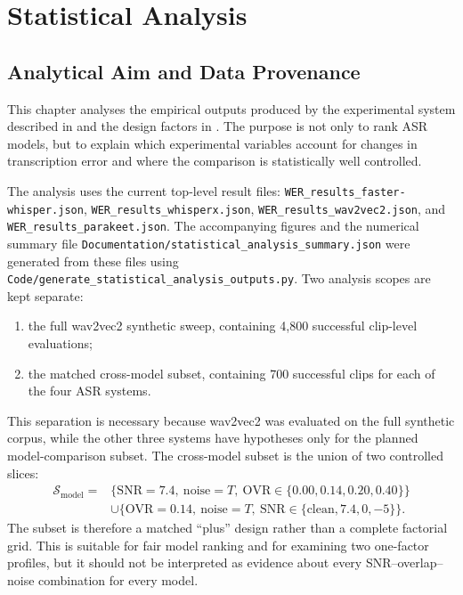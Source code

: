 \chapter{Statistical Analysis}

\section{Analytical Aim and Data Provenance}
This chapter analyses the empirical outputs produced by the experimental system described in
 and the design factors in . The purpose is not
only to rank ASR models, but to explain which experimental variables account for changes in
transcription error and where the comparison is statistically well controlled.

The analysis uses the current top-level result files:
\texttt{WER\_results\_faster-whisper.json},
\texttt{WER\_results\_whisperx.json},
\texttt{WER\_results\_wav2vec2.json}, and
\texttt{WER\_results\_parakeet.json}. The accompanying figures and the numerical summary file
\texttt{Documentation/statistical\_analysis\_summary.json} were generated from these files using
\texttt{Code/generate\_statistical\_analysis\_outputs.py}. Two analysis scopes are kept separate:
\begin{enumerate}
    \item the full wav2vec2 synthetic sweep, containing 4,800 successful clip-level evaluations;
    \item the matched cross-model subset, containing 700 successful clips for each of the four
    ASR systems.
\end{enumerate}

This separation is necessary because wav2vec2 was evaluated on the full synthetic corpus, while
the other three systems have hypotheses only for the planned model-comparison subset. The
cross-model subset is the union of two controlled slices:
\begin{equation}
\begin{split}
\mathcal{S}_{\mathrm{model}} ={}&
\{\mathrm{SNR}=7.4,\ \mathrm{noise}=T,\ \mathrm{OVR}\in\{0.00,0.14,0.20,0.40\}\}\\
&\cup
\{\mathrm{OVR}=0.14,\ \mathrm{noise}=T,\ \mathrm{SNR}\in\{\mathrm{clean},7.4,0,-5\}\}.
\end{split}
\end{equation}
The subset is therefore a matched ``plus'' design rather than a complete factorial grid. This
is suitable for fair model ranking and for examining two one-factor profiles, but it should not
be interpreted as evidence about every SNR--overlap--noise combination for every model.

